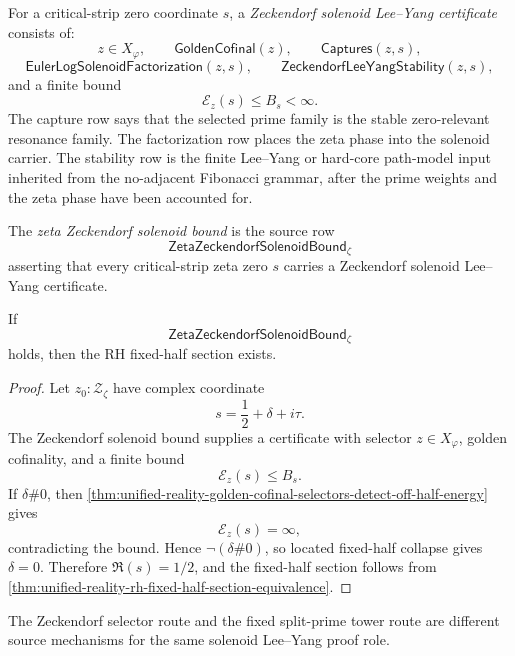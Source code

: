 \begin{definition}
\label{def:unified-reality-zeckendorf-solenoid-lee-yang-certificate}
For a critical-strip zero coordinate $s$, a \emph{Zeckendorf solenoid
Lee--Yang certificate} consists of:
$$
z\in X_{\varphi},
\qquad
\mathsf{GoldenCofinal}(z),
\qquad
\mathsf{Captures}(z,s),
$$
$$
\mathsf{EulerLogSolenoidFactorization}(z,s),
\qquad
\mathsf{ZeckendorfLeeYangStability}(z,s),
$$
and a finite bound
$$
\mathcal E_z(s)\le B_s<\infty.
$$
The capture row says that the selected prime family is the stable
zero-relevant resonance family.  The factorization row places the zeta
phase into the solenoid carrier.  The stability row is the finite
Lee--Yang or hard-core path-model input inherited from the no-adjacent
Fibonacci grammar, after the prime weights and the zeta phase have been
accounted for.
\end{definition}

\begin{definition}
\label{def:unified-reality-zeta-zeckendorf-solenoid-bound}
The \emph{zeta Zeckendorf solenoid bound} is the source row
$$
\mathsf{ZetaZeckendorfSolenoidBound}_{\zeta}
$$
asserting that every critical-strip zeta zero $s$ carries a Zeckendorf
solenoid Lee--Yang certificate.
\end{definition}

\begin{theorem}
\label{thm:unified-reality-zeckendorf-solenoid-bound-conditionally-sufficient}
If
$$
\mathsf{ZetaZeckendorfSolenoidBound}_{\zeta}
$$
holds, then the RH fixed-half section exists.
\end{theorem}

\begin{proof}
Let $z_0:\mathcal Z_{\zeta}$ have complex coordinate
$$
s=\frac12+\delta+i\tau.
$$
The Zeckendorf solenoid bound supplies a certificate with selector
$z\in X_{\varphi}$, golden cofinality, and a finite bound
$$
\mathcal E_z(s)\le B_s.
$$
If $\delta\#0$, then
\autoref{thm:unified-reality-golden-cofinal-selectors-detect-off-half-energy}
gives
$$
\mathcal E_z(s)=\infty,
$$
contradicting the bound.  Hence $\neg(\delta\#0)$, so located fixed-half
collapse gives $\delta=0$.  Therefore $\Re(s)=1/2$, and the fixed-half
section follows from
\autoref{thm:unified-reality-rh-fixed-half-section-equivalence}.
\end{proof}

\begin{corollary}
\label{cor:unified-reality-selector-and-split-tower-routes-complementary}
The Zeckendorf selector route and the fixed split-prime tower route are
different source mechanisms for the same solenoid Lee--Yang proof role.
\end{corollary}

